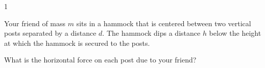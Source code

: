 
\AddToShipoutPicture*{\BackgroundPic}

\addtocounter {ProbNum} {1}

 
{\bf \Large{}} Your friend of mass ${m}$ sits in a hammock that is centered between two vertical posts separated by a distance ${d}$. The hammock dips a distance ${h}$ below the height at which the hammock is secured to the posts. 

\bigskip
What is the horizontal force on each post due to your friend? 



\vfill
\newpage